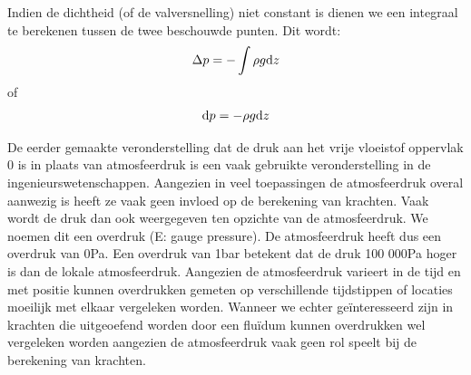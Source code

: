 Indien de dichtheid (of de valversnelling) niet constant is dienen we een integraal te berekenen tussen de twee beschouwde punten. Dit wordt:
\begin{equation}
	\Delta p = -\int \rho g \mathrm{d} z
\end{equation}
of
\begin{equation}
	\mathrm{d} p = -\rho g \mathrm{d} z
\end{equation}

De eerder gemaakte veronderstelling dat de druk aan het vrije vloeistof oppervlak 0 is in plaats van atmosfeerdruk is een vaak gebruikte veronderstelling in de ingenieurswetenschappen. Aangezien in veel toepassingen de atmosfeerdruk overal aanwezig is heeft ze vaak geen invloed op de berekening van krachten. Vaak wordt de druk dan ook weergegeven ten opzichte van de atmosfeerdruk. We noemen dit een overdruk (E: gauge pressure). De atmosfeerdruk heeft dus een overdruk van 0\unit{Pa}. Een overdruk van 1\unit{bar} betekent dat de druk 100 000\unit{Pa} hoger is dan de lokale atmosfeerdruk. Aangezien de atmosfeerdruk varieert in de tijd en met positie kunnen overdrukken gemeten op verschillende tijdstippen of locaties moeilijk met elkaar vergeleken worden. Wanneer we echter geïnteresseerd zijn in krachten die uitgeoefend worden door een fluïdum kunnen overdrukken wel vergeleken worden aangezien de atmosfeerdruk vaak geen rol speelt bij de berekening van krachten.


